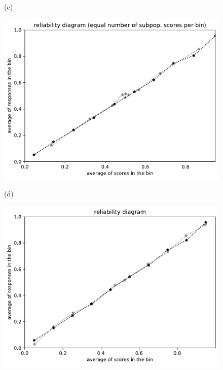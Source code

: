 \documentclass{article}
\newlength{\vertsep}
\newlength{\imsize}
\begin{document}
\begin{figure}
\begin{centering}
(c)
\parbox{\imsize}{\includegraphics[width=\imsize]
{../codes/unweighted/10000_7000_10_3/equisamps.pdf}}
\quad\quad
(d)
\parbox{\imsize}{\includegraphics[width=\imsize]
{../codes/unweighted/10000_7000_10_3/equiscore.pdf}}

\vspace{\vertsep}


\end{centering}
\end{figure}
\end{document}

